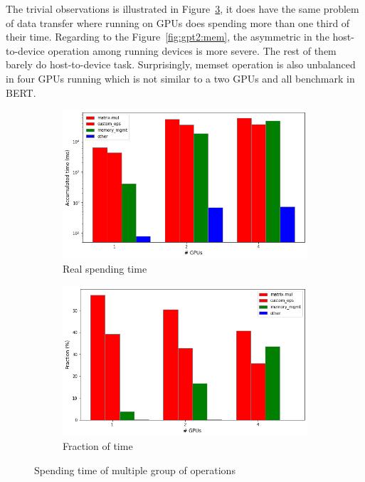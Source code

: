 The trivial observations is illustrated in Figure~\ref{fig:gpt2:group_runtime}, it does have the same problem of data transfer where running on GPUs does spending more than one third of their time. Regarding to the Figure~\ref{fig:gpt2:mem}, the asymmetric in the host-to-device operation among running devices is more severe. The rest of them barely do host-to-device task. Surprisingly, memset operation is also unbalanced in four GPUs running which is not similar to a two GPUs and all benchmark in BERT.

\begin{figure}[htbp]
    \centering
    \begin{subfigure}{.5\textwidth}
        \centering
        \includegraphics[width=\linewidth]{fig/gpt2/timegroup.png}
        \caption{Real spending time}
        \label{fig:gpt2:timegroup}
    \end{subfigure}%
    \begin{subfigure}{.5\textwidth}
        \centering
        \includegraphics[width=\linewidth]{fig/gpt2/timegroup_frac.png}
        \caption{Fraction of time}
        \label{fig:gpt2:timegroup_frac}
    \end{subfigure}
    \caption{Spending time of multiple group of operations}
\label{fig:gpt2:group_runtime}
\end{figure}

